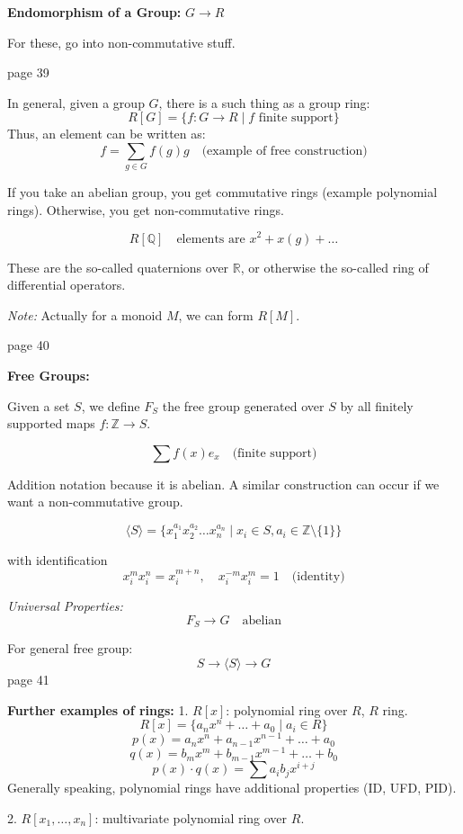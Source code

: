 \documentclass{article}
\begin{document}
\textbf{Endomorphism of a Group:}
$G \to R$

For these, go into non-commutative stuff.

\newpage
\noindent page 39

In general, given a group $G$, there is a such thing as a group ring:
\[
R[G] = \{ f: G \to R \mid f \text{ finite support} \}
\]
Thus, an element can be written as:
\[
f = \sum_{g \in G} f(g)g \quad \text{(example of free construction)}
\]

If you take an abelian group, you get commutative rings (example polynomial rings). Otherwise, you get non-commutative rings.

\[
R[\mathbb{Q}] \quad \text{elements are } x^2 + x(g) + \ldots
\]

These are the so-called quaternions over $\mathbb{R}$, or otherwise the so-called ring of differential operators.

\textit{Note:} Actually for a monoid $M$, we can form $R[M]$.

\newpage
\noindent page 40

\textbf{Free Groups:}

Given a set $S$, we define $F_S$ the free group generated over $S$ by all finitely supported maps $f: \mathbb{Z} \to S$.

\[
\sum f(x) e_x \quad \text{(finite support)}
\]

Addition notation because it is abelian. A similar construction can occur if we want a non-commutative group.

\[
\langle S \rangle = \{ x_1^{a_1} x_2^{a_2} \ldots x_n^{a_n} \mid x_i \in S, a_i \in \mathbb{Z} \setminus \{ 1 \} \}
\]

with identification
\[
x_i^m x_i^n = x_i^{m+n}, \quad x_i^{-m} x_i^m = 1 \quad \text{(identity)}
\]

\textit{Universal Properties:}
\[
F_S \to G \quad \text{abelian}
\]

For general free group:
\[
S \to \langle S \rangle \to G
\]
\newpage
\noindent page 41

\textbf{Further examples of rings:}
1. $R[x]$: polynomial ring over $R$, $R$ ring.
\[
R[x] = \{ a_n x^n + \ldots + a_0 \mid a_i \in R \}
\]
\[
p(x) = a_n x^n + a_{n-1} x^{n-1} + \ldots + a_0
\]
\[
q(x) = b_m x^m + b_{m-1} x^{m-1} + \ldots + b_0
\]
\[
p(x) \cdot q(x) = \sum a_i b_j x^{i+j}
\]
Generally speaking, polynomial rings have additional properties (ID, UFD, PID).

2. $R[x_1, \ldots, x_n]$: multivariate polynomial ring over $R$.
\end{document}

